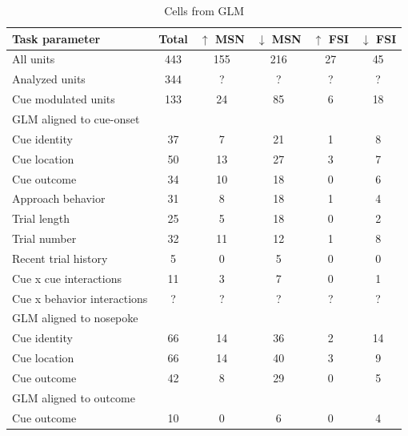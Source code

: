 \documentclass[11pt]{article}
\begin{document}
\begin{table}[p]
\centering
\setlength{\tabcolsep}{1 em} %
\begin{tabular}{l c  c c c c}

Task parameter                                 & Total        & $\uparrow$ MSN        & $\downarrow$ MSN        & $\uparrow$ FSI       & $\downarrow$ FSI\\
\hline
All units                       & 443        & 155         & 216          & 27          & 45\\
\hline
Analyzed units                       & 344        & ?         & ?         & ?          & ?\\
\hline
Cue modulated units                      & 133         &24          &85          & 6          &18\\
\hline
GLM aligned to cue-onset                       &         &       &          &          &\\
\hline
Cue identity       & 37         & 7          & 21          & 1          & 8\\
\hline
Cue location       & 50         &13          & 27          & 3          & 7\\
\hline
Cue outcome       & 34         & 10          & 18        & 0          & 6\\
\hline
Approach behavior      & 31         & 8          & 18          & 1          & 4\\
\hline
Trial length       & 25        & 5          & 18         & 0         & 2\\
\hline
Trial number       & 32         & 11          & 12         & 1          & 8\\
\hline
Recent trial history       & 5         & 0          &5          & 0          & 0\\
\hline
Cue x cue interactions       & 11         & 3          & 7          & 0          & 1\\
\hline
Cue x behavior interactions       & ?         & ?          & ?          & ?          & ?\\
\hline
GLM aligned to nosepoke                       &         &       &          &          &\\
\hline
Cue identity       & 66         &14          & 36          & 2          &14\\
\hline
Cue location       & 66         &14          & 40          & 3          & 9\\
\hline
Cue outcome       & 42        & 8          & 29        & 0          & 5\\
\hline
GLM aligned to outcome                       &         &       &          &          &\\
\hline
Cue outcome       & 10        & 0          & 6       & 0          &4\\
\hline

\end{tabular}
\caption {Cells from GLM} \label{tbl2} 
\end{table}
\end{document}

